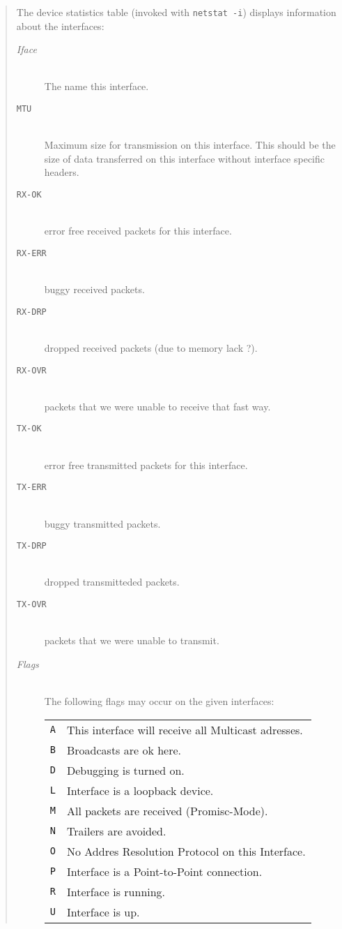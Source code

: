 \begin{appendix}
\begin{english}
\begin{quote}
	The device statistics table (invoked with {\tt netstat -i})
	displays information about the interfaces:
	\begin{description}
		\item[{\sl Iface}]\mbox{}\\
			The name this interface.
		\item[{\tt MTU}]\mbox{}\\
			Maximum size for transmission on this interface. This
			should be the size of data transferred on this interface
			without interface specific headers.
		\item[{\tt RX-OK}]\mbox{}\\
			error free received packets for this interface.
		\item[{\tt RX-ERR}]\mbox{}\\
			buggy received packets.
		\item[{\tt RX-DRP}]\mbox{}\\
			dropped received packets (due to memory lack ?).
		\item[{\tt RX-OVR}]\mbox{}\\
			packets that we were unable to receive that fast way.
		\item[{\tt TX-OK}]\mbox{}\\
			error free transmitted packets for this interface.
		\item[{\tt TX-ERR}]\mbox{}\\
			buggy transmitted packets.
		\item[{\tt TX-DRP}]\mbox{}\\
			dropped transmitteded packets.
		\item[{\tt TX-OVR}]\mbox{}\\
			packets that we were unable to transmit.
		\item[{\sl Flags}]\mbox{}\\
			The following flags may occur on the given interfaces:\\
			\begin{tabular}{lp{8cm}}
			{\tt A} & This interface will receive all Multicast adresses.\\
			{\tt B} & Broadcasts are ok here.\\
			{\tt D} & Debugging is turned on.\\
			{\tt L} & Interface is a loopback device.\\
			{\tt M} & All packets are received (Promisc-Mode).\\
			{\tt N} & Trailers are avoided.\\
			{\tt O} & No Addres Resolution Protocol on this Interface.\\
			{\tt P} & Interface is a Point-to-Point connection.\\
			{\tt R} & Interface is running.\\
			{\tt U} & Interface is up.
			\end{tabular}
	\end{description}


\end{quote}
\end{english}
\end{appendix}
